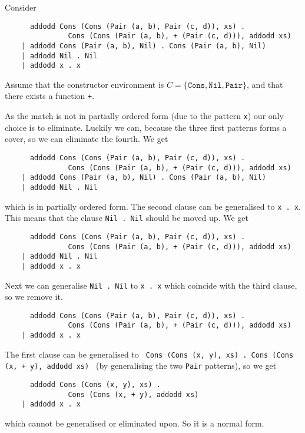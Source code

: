 \begin{example}
Consider
\begin{lstlisting}
      addodd Cons (Cons (Pair (a, b), Pair (c, d)), xs) .
               Cons (Cons (Pair (a, b), + (Pair (c, d))), addodd xs)
    | addodd Cons (Pair (a, b), Nil) . Cons (Pair (a, b), Nil)
    | addodd Nil . Nil
    | addodd x . x
\end{lstlisting}
Assume that the constructor environment is $C = \{\mathtt{Cons}, \mathtt{Nil},
\mathtt{Pair}\}$, and that there exists a function \texttt{+}.

As the match is not in partially ordered form (due to the pattern \texttt{x})
our only choice is to eliminate. Luckily we can, because the three first
patterns forms a cover, so we can eliminate the fourth. We get
\begin{lstlisting}
      addodd Cons (Cons (Pair (a, b), Pair (c, d)), xs) .
               Cons (Cons (Pair (a, b), + (Pair (c, d))), addodd xs)
    | addodd Cons (Pair (a, b), Nil) . Cons (Pair (a, b), Nil)
    | addodd Nil . Nil
\end{lstlisting}
which is in partially ordered form. The second clause can be generalised to
\texttt{x . x}. This means that the clause \texttt{Nil . Nil} should be moved
up. We get
\begin{lstlisting}
      addodd Cons (Cons (Pair (a, b), Pair (c, d)), xs) .
               Cons (Cons (Pair (a, b), + (Pair (c, d))), addodd xs)
    | addodd Nil . Nil
    | addodd x . x
\end{lstlisting}
Next we can generalise \texttt{Nil . Nil} to \texttt{x . x} which coincide with
the third clause, so we remove it.
\begin{lstlisting}
      addodd Cons (Cons (Pair (a, b), Pair (c, d)), xs) .
               Cons (Cons (Pair (a, b), + (Pair (c, d))), addodd xs)
    | addodd x . x
\end{lstlisting}
The first clause can be generalised to \texttt{
  Cons (Cons (x, y), xs) . Cons (Cons (x, + y), addodd xs)
} (by generalising the two \texttt{Pair} patterns), so we get
\begin{lstlisting}
      addodd Cons (Cons (x, y), xs) .
               Cons (Cons (x, + y), addodd xs)
    | addodd x . x
\end{lstlisting}
which cannot be generalised or eliminated upon. So it is a normal form.

\end{example}

